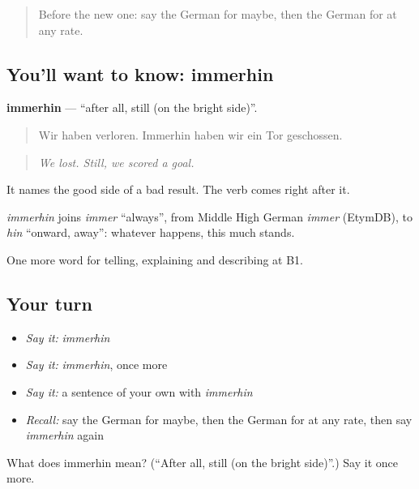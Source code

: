 \begin{quote}
Before the new one: say the German for maybe, then the German for at any rate.
\end{quote}

\subsection*{You'll want to know: immerhin}
\textbf{immerhin} — \textquotedblleft{}after all, still (on the bright side)\textquotedblright{}.

\begin{quote}
Wir haben verloren. Immerhin haben wir ein Tor geschossen.
\end{quote}

\begin{quote}
\emph{We lost. Still, we scored a goal.}
\end{quote}

It names the good side of a bad result. The verb comes right after it.

\begin{cousinweb}
\emph{immerhin} joins \emph{immer} \textquotedblleft{}always\textquotedblright{}, from Middle High German \emph{immer} (EtymDB), to \emph{hin} \textquotedblleft{}onward, away\textquotedblright{}: whatever happens, this much stands.
\end{cousinweb}

\begin{grammarlens}[title={What you've built}]
One more word for telling, explaining and describing at B1.
\end{grammarlens}

\subsection*{Your turn}
\begin{itemize}
\raggedright
  \item \emph{Say it:} \emph{immerhin}
  \item \emph{Say it:} \emph{immerhin}, once more
  \item \emph{Say it:} a sentence of your own with \emph{immerhin}
  \item \emph{Recall:} say the German for maybe, then the German for at any rate, then say \emph{immerhin} again
\end{itemize}

\begin{tcolorbox}[breakable,colback=teal!4,colframe=teal!35!black,title={Before you move on}]
What does immerhin mean? (\textquotedblleft{}After all, still (on the bright side)\textquotedblright{}.) Say it once more.
\end{tcolorbox}
